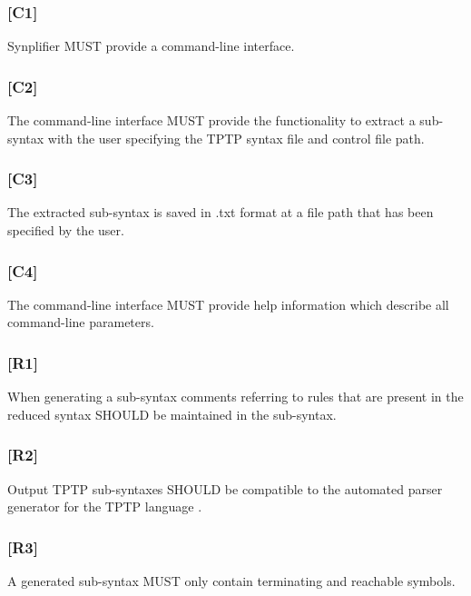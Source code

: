 \subsubsection{[C1]}\label{C1}
\ac{Synplifier} MUST provide a command-line interface.
\subsubsection{[C2]}\label{C2}
The command-line interface MUST provide the functionality to extract a sub-syntax with the user specifying the \ac{TPTP} syntax file and control file path.
\subsubsection{[C3]}\label{C3}
The extracted sub-syntax is saved in .txt format at a file path that has been specified by the user.
\subsubsection{[C4]}\label{C4}
The command-line interface MUST provide help information which describe all command-line parameters.
\subsubsection{[R1]}\label{R1}
When generating a sub-syntax comments referring to rules that are present in the reduced syntax SHOULD be maintained in the sub-syntax.
\subsubsection{[R2]}\label{R2}
Output \ac{TPTP} sub-syntaxes SHOULD be compatible to the automated parser generator for the \ac{TPTP} language \cite{VS06}.
\subsubsection{[R3]}\label{R3}
A generated sub-syntax MUST only contain terminating and reachable symbols.


%

